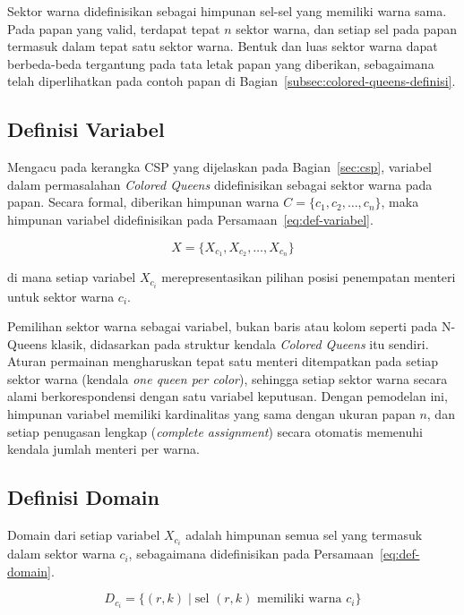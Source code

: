 Sektor warna didefinisikan sebagai himpunan sel-sel yang memiliki warna sama. Pada papan yang valid, terdapat tepat $n$ sektor warna, dan setiap sel pada papan termasuk dalam tepat satu sektor warna. Bentuk dan luas sektor warna dapat berbeda-beda tergantung pada tata letak papan yang diberikan, sebagaimana telah diperlihatkan pada contoh papan di Bagian~\ref{subsec:colored-queens-definisi}.

\subsection{Definisi Variabel}
\label{subsec:definisi-variabel}

Mengacu pada kerangka CSP yang dijelaskan pada Bagian~\ref{sec:csp}, variabel dalam permasalahan \textit{Colored Queens} didefinisikan sebagai sektor warna pada papan. Secara formal, diberikan himpunan warna $C = \{c_1, c_2, \dots, c_n\}$, maka himpunan variabel didefinisikan pada Persamaan~\ref{eq:def-variabel}.

\begin{equation}
	X = \{X_{c_1}, X_{c_2}, \dots, X_{c_n}\}
	\label{eq:def-variabel}
\end{equation}

di mana setiap variabel $X_{c_i}$ merepresentasikan pilihan posisi penempatan menteri untuk sektor warna $c_i$.

Pemilihan sektor warna sebagai variabel, bukan baris atau kolom seperti pada N-Queens klasik, didasarkan pada struktur kendala \textit{Colored Queens} itu sendiri. Aturan permainan mengharuskan tepat satu menteri ditempatkan pada setiap sektor warna (kendala \textit{one queen per color}), sehingga setiap sektor warna secara alami berkorespondensi dengan satu variabel keputusan. Dengan pemodelan ini, himpunan variabel memiliki kardinalitas yang sama dengan ukuran papan $n$, dan setiap penugasan lengkap (\textit{complete assignment}) secara otomatis memenuhi kendala jumlah menteri per warna.

\subsection{Definisi Domain}
\label{subsec:definisi-domain}

Domain dari setiap variabel $X_{c_i}$ adalah himpunan semua sel yang termasuk dalam sektor warna $c_i$, sebagaimana didefinisikan pada Persamaan~\ref{eq:def-domain}.

\begin{equation}
	D_{c_i} = \{(r, k) \mid \text{sel } (r, k) \text{ memiliki warna } c_i\}
	\label{eq:def-domain}
\end{equation}

